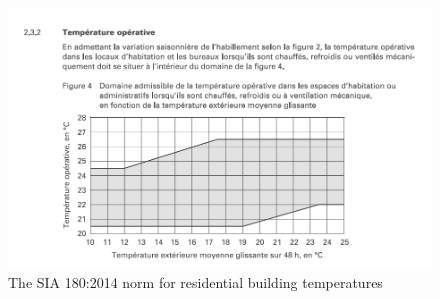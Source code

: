 \begin{figure}[ht]
    \centering
    \includegraphics[width = \textwidth]{Images/sia_180_2014.png}
    \caption{The SIA 180:2014 norm for residential building
    temperatures~\cite{sia180:2014ProtectionThermiqueProtection2014}}
    \label{fig:sia_temperature_norm}
\end{figure}

\clearpage
